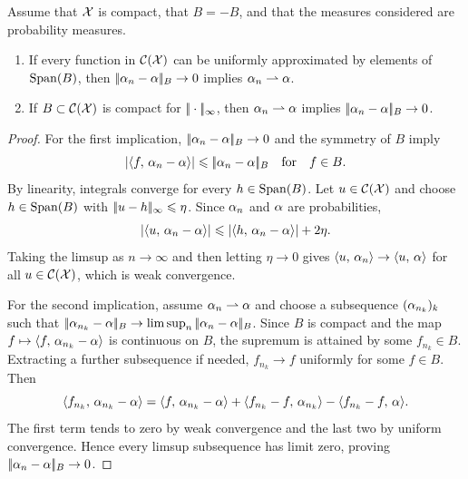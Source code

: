 \begin{prop}\label{prop-dual-norm-metrization}
	Assume that $\mathcal{X}$ is compact, that $B=-B$, and that the measures considered are probability measures.
	\begin{enumerate}
		\item If every function in $\mathcal{C}(\mathcal{X})$ can be uniformly approximated by elements of $\operatorname{Span}(B)$, then $|\!| \alpha_n-\alpha |\!|_B \rightarrow 0$ implies $\alpha_n \rightharpoonup \alpha$.
		\item If $B \subset \mathcal{C}(\mathcal{X})$ is compact for $|\!| \cdot |\!|_\infty$, then $\alpha_n \rightharpoonup \alpha$ implies $|\!| \alpha_n-\alpha |\!|_B \rightarrow 0$.
	\end{enumerate}
\end{prop}
\begin{proof}
	For the first implication, $|\!| \alpha_n-\alpha |\!|_B\to0$ and the symmetry of $B$ imply
	\[
		\left\lvert\langle f,\,\alpha_n-\alpha\rangle\right\rvert\leqslant |\!| \alpha_n-\alpha |\!|_B
		\quad \text{for} \quad f\in B.
	\]
	By linearity, integrals converge for every $h\in\operatorname{Span}(B)$. Let $u\in\mathcal{C}(\mathcal{X})$ and choose $h\in\operatorname{Span}(B)$ with $|\!| u-h |\!|_\infty\leqslant\eta$. Since $\alpha_n$ and $\alpha$ are probabilities,
	\[
		\left\lvert\langle u,\,\alpha_n-\alpha\rangle\right\rvert
		\leqslant
		\left\lvert\langle h,\,\alpha_n-\alpha\rangle\right\rvert+2\eta.
	\]
	Taking the limsup as $n\to\infty$ and then letting $\eta\to0$ gives $\langle u,\,\alpha_n\rangle\to\langle u,\,\alpha\rangle$ for all $u\in\mathcal{C}(\mathcal{X})$, which is weak convergence.

	For the second implication, assume $\alpha_n\rightharpoonup\alpha$ and choose a subsequence $(\alpha_{n_k})_k$ such that $|\!| \alpha_{n_k}-\alpha |\!|_B\to\limsup_n|\!| \alpha_n-\alpha |\!|_B$. Since $B$ is compact and the map $f\mapsto\langle f,\,\alpha_{n_k}-\alpha\rangle$ is continuous on $B$, the supremum is attained by some $f_{n_k}\in B$. Extracting a further subsequence if needed, $f_{n_k}\to f$ uniformly for some $f\in B$. Then
	\[
		\langle f_{n_k},\,\alpha_{n_k}-\alpha\rangle
		=
		\langle f,\,\alpha_{n_k}-\alpha\rangle
		+\langle f_{n_k}-f,\,\alpha_{n_k}\rangle
		-\langle f_{n_k}-f,\,\alpha\rangle.
	\]
	The first term tends to zero by weak convergence and the last two by uniform convergence. Hence every limsup subsequence has limit zero, proving $|\!| \alpha_n-\alpha |\!|_B\to0$.
\end{proof}

